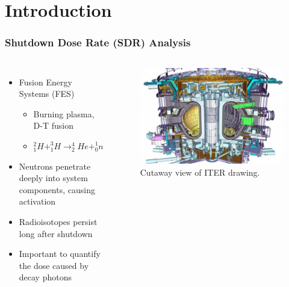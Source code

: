 \documentclass{beamer}
\begin{document}
\section{Introduction}
\begin{frame}
	\frametitle{Shutdown Dose Rate (SDR) Analysis}

\begin{columns}
\begin{itemize}
	\item{Fusion Energy Systems (FES)}
		\begin{itemize}
			\item{Burning plasma, D-T fusion}
			\item{$^{2}_{1}H + ^{3}_{1}H \rightarrow ^{4}_{2}He + ^{1}_{0} n$}
		\end{itemize}
	\item{Neutrons penetrate deeply into system components,
				causing activation}
	\item{Radioisotopes persist long after shutdown}
	\item{Important to quantify the dose caused by decay photons}
\end{itemize}
\begin{figure}
	\centering
	\includegraphics[scale=0.22]{iter.jpg}
	\caption{Cutaway view of ITER drawing.}
\end{figure}

\end{columns}
		
\end{frame}
\end{document}
